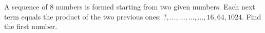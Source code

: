 A sequence of $8$ numbers is formed starting from two given numbers. Each next term equals the product of the two previous ones: $?, \ldots, \ldots, \ldots, \ldots, 16, 64, 1024$. Find the first number.
